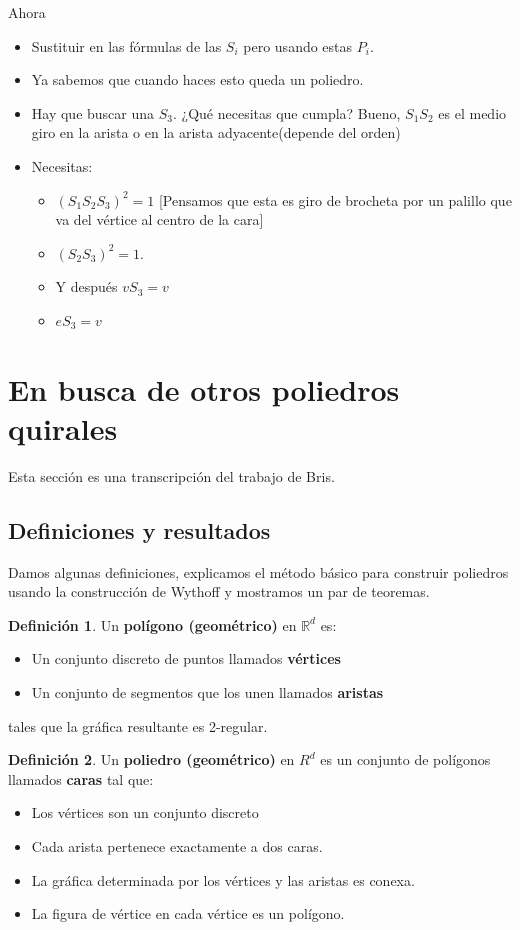 \documentclass[spanish]{article}
\theoremstyle{definition}
\newtheorem*{defn}{Definición}
\newcommand{\R}{\mathbb{R}}
\begin{document}
Ahora
\begin{itemize}
	\item Sustituir en las fórmulas de las $S_i$ pero usando estas $P_i$.
	\item Ya sabemos que cuando haces esto queda un poliedro.
	\item Hay que buscar una $S_3$. ¿Qué necesitas que cumpla? Bueno, $S_1S_2$ es el medio giro en la arista o en la arista adyacente(depende del orden)
	\item Necesitas:
	\begin{itemize}
		\item $(S_1S_2S_3)^2=1$ [Pensamos que esta es giro de brocheta por un palillo que va del vértice al centro de la cara]
		\item $(S_2S_3)^2=1$.
			\item Y después $vS_3=v$
		\item $eS_3=v$
	\end{itemize}
\end{itemize}

\section{En busca de otros poliedros quirales}
Esta sección es una transcripción del trabajo de Bris.

\subsection{Definiciones y resultados}
Damos algunas definiciones, explicamos el método básico para construir poliedros usando la construcción de Wythoff y mostramos un par de teoremas.

\begin{defn}
	Un \textbf{polígono (geométrico)} en $\R^d$ es:
	\begin{itemize}
		\item Un conjunto discreto de puntos llamados \textbf{vértices}
		\item Un conjunto de segmentos que los unen llamados \textbf{aristas}
	\end{itemize}
	tales que la gráfica resultante es 2-regular.
\end{defn}

\begin{defn}
	Un \textbf{poliedro (geométrico)} en $R^d$ es un conjunto de polígonos llamados \textbf{caras} tal que:
	\begin{itemize}
		\item Los vértices son un conjunto discreto
		\item Cada arista pertenece exactamente a dos caras.
		\item La gráfica determinada por los vértices y las aristas es conexa.
		\item La figura de vértice en cada vértice es un polígono.
	\end{itemize}
\end{defn}
\end{document}
